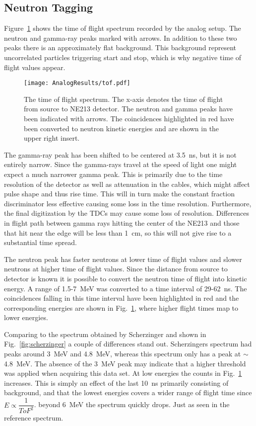 \documentclass[main.tex]{subfiles}
\begin{document}
\subsection{Neutron Tagging}
Figure~\ref{fig:tof_a} shows the time of flight spectrum recorded by the analog setup. The neutron and gamma-ray peaks marked with arrows. In addition to these two peaks there is an approximately flat background. This background represent uncorrelated particles triggering start and stop, which is why negative time of flight values appear.
\begin{figure}[ht]
    \centering
        \texttt{[image: AnalogResults/tof.pdf]}
        \caption[Time of flight spectrum, analog setup.]{The time of flight spectrum. The x-axis denotes the time of flight from source to NE213 detector. The neutron and gamma peaks have been indicated with arrows. The coincidences highlighted in red have been converted to neutron kinetic energies and are shown in the upper right insert.}
    \label{fig:tof_a}
\end{figure}

The gamma-ray peak has been shifted to be centered at \SI{3.5}{ns}, but it is not entirely narrow. Since the gamma-rays travel at the speed of light one might expect a much narrower gamma peak. This is primarily due to the time resolution of the detector as well as attenuation in the cables, which might affect pulse shape and thus rise time. This will in turn make the constant fraction discriminator less effective causing some loss in the time resolution. Furthermore, the final  digitization by the TDCs may cause some loss of resolution. Differences in flight path between gamma rays hitting the center of the NE213 and those that hit near the edge will be less than \SI{1}{cm}, so this will not give rise to a substantial time spread. 

The neutron peak has faster neutrons at lower time of flight values and slower neutrons at higher time of flight values. Since the distance from source to detector is known it is possible to convert the neutron time of flight into kinetic energy. A range of 1.5-\SI{7}{\MeV} was converted to a time interval of 29-\SI{62}{\ns}. The coincidences falling in this time interval have been highlighted in red and the corresponding energies are shown in Fig.~\ref{fig:tof_a}, where higher flight times map to lower energies.

Comparing to the spectrum obtained by Scherzinger\cite{ScherzingerPhd} and shown in Fig.~\ref{fig:scherzinger} a couple of differences stand out. Scherzingers spectrum had peaks around \SI{3}{\MeV} and \SI{4.8}{\MeV}, whereas this spectrum only has a peak at $\sim$\SI{4.8}{\MeV}. The absence of the \SI{3}{\MeV} peak may indicate that a higher threshold was applied when acquiring this data set. At low energies the counts in Fig.~\ref{fig:tof_a} increases. This is simply an effect of the last \SI{10}{\ns} primarily consisting of background, and that the lowest energies covers a wider range of flight time since $E\propto \dfrac{1}{ToF^2}$. beyond \SI{6}{\MeV} the spectrum quickly drops. Just as seen in the reference spectrum.
\end{document}
